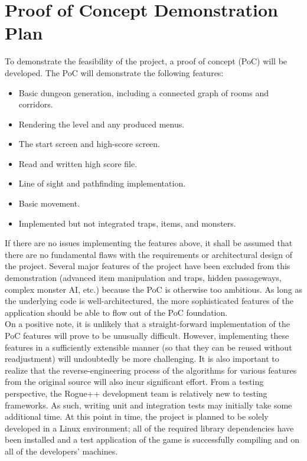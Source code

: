 \documentclass{article}
\newcommand{\rev}[1]{\textcolor{RevisionColour}{#1}}
\begin{document}
\section{Proof of Concept Demonstration Plan}
\label{poc_label}

\indent
To demonstrate the feasibility of the project, a proof of concept (PoC) will be developed. The PoC will demonstrate the following features:

\begin{itemize}
	\item \rev{Basic dungeon generation, including a connected graph of rooms and corridors.}
	\item \rev{Rendering the level and any produced menus.}
	\item \rev{The start screen and high-score screen.}
	\item \rev{Read and written high score file.}
	\item \rev{Line of sight and pathfinding implementation.}
	\item \rev{Basic movement.}
	\item \rev{Implemented but not integrated traps, items, and monsters.}
\end{itemize}

If there are no issues implementing the features above, it shall be assumed that there are no fundamental flaws with the requirements or architectural design of the project.  Several major features of the project have been excluded from this demonstration (advanced item manipulation and traps, hidden passageways, complex monster AI, etc.) because the PoC is otherwise too ambitious.  As long as the underlying code is well-architectured, the more sophisticated features of the application should be able to flow out of the PoC foundation.\\	

On a positive note, it is unlikely that a straight-forward implementation of the PoC features will prove to be unusually difficult.  However, implementing these features in a sufficiently extensible manner (so that they can be reused without readjustment) will undoubtedly be more challenging.  It is also important to realize that the reverse-engineering process of the algorithms for various features from the original source will also incur significant effort.  From a testing perspective, the Rogue++ development team is relatively new to testing frameworks.  As such, writing unit and integration tests may initially take some additional time.  At this point in time, the project is planned to be solely developed in a Linux environment; all of the required library dependencies have been installed and a test application of the game is successfully compiling and on all of the developers' machines.
\end{document}
